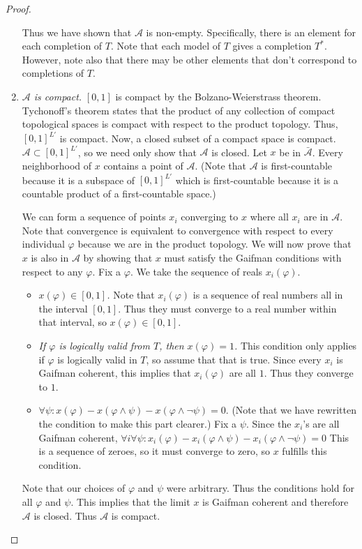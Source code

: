 \documentclass[12pt]{article}
\theoremstyle{plain}
\theoremstyle{definition}
\theoremstyle{remark}
\begin{document}
\begin{proof}
\begin{enumerate}
Thus we have shown that $\mathcal{A}$ is non-empty. Specifically, there is an element for each completion of $T$. Note that each model of $T$ gives a completion $T^{*}$. However, note also that there may be other elements that don't correspond to completions of $T$.

\item \emph{$\mathcal{A}$ is compact.}
$[0,1]$ is compact by the Bolzano-Weierstrass theorem.
Tychonoff's theorem states that the product of any collection of compact topological spaces is compact with respect to the product topology.
Thus, $[0,1]^{L'}$ is compact.
Now, a closed subset of a compact space is compact.
$\mathcal{A}\subset [0,1]^{L'}$, so we need only show that $\mathcal{A}$ is closed.
Let $x$ be in $\bar{\mathcal{A}}$.
Every neighborhood of $x$ contains a point of $\mathcal{A}$.
(Note that $\mathcal{A}$ is first-countable because it is a subspace of $[0, 1]^{L'}$ which is first-countable because it is a countable product of a first-countable space.)

We can form a sequence of points $x_i$ converging to $x$ where all $x_i$ are in $\mathcal{A}$.
Note that convergence is equivalent to convergence with respect to every individual $\varphi$ because we are in the product topology.
We will now prove that $x$ is also in $\mathcal{A}$ by showing that $x$ must satisfy the Gaifman conditions with respect to any $\varphi$. 
Fix a $\varphi$.
We take the sequence of reals $x_i(\varphi)$.
\begin{itemize}
\item \emph{$x(\varphi)\in [0,1]$.}
Note that $x_i(\varphi)$ is a sequence of real numbers all in the interval $[0, 1]$.
Thus they must converge to a real number within that interval, so $x(\varphi)\in[0,1]$.
\item \emph{If $\varphi$ is logically valid from $T$, then $x(\varphi)=1$.}
This condition only applies if $\varphi$ is logically valid in $T$, so assume that that is true.
Since every $x_i$ is Gaifman coherent, this implies that $x_i(\varphi)$ are all $1$. Thus they converge to $1$.
\item $\forall \psi: x(\varphi) -x(\varphi\wedge\psi)-x(\varphi\wedge\neg\psi)=0$.
(Note that we have rewritten the condition to make this part clearer.)
Fix a $\psi$.
Since the $x_i$'s are all Gaifman coherent, $\forall i\forall \psi: x_i(\varphi) -x_i(\varphi\wedge\psi)-x_i(\varphi\wedge\neg\psi)=0$
This is a sequence of zeroes, so it must converge to zero, so $x$ fulfills this condition.
\end{itemize}
Note that our choices of $\varphi$ and $\psi$ were arbitrary. Thus the conditions hold for all $\varphi$ and $\psi$. This implies that the limit $x$ is Gaifman coherent and therefore $\mathcal{A}$ is closed.
Thus $\mathcal{A}$ is compact.


\end{enumerate}
\end{proof}
\end{document}

